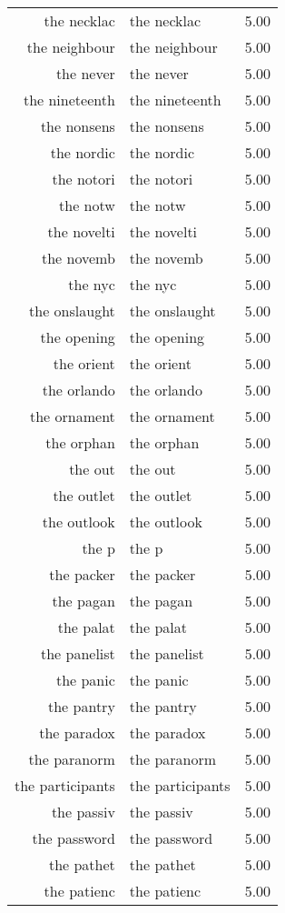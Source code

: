 \begin{table}[ht]
\begin{tabular}{rlr}
  the necklac & the necklac & 5.00 \\ 
  the neighbour & the neighbour & 5.00 \\ 
  the never & the never & 5.00 \\ 
  the nineteenth & the nineteenth & 5.00 \\ 
  the nonsens & the nonsens & 5.00 \\ 
  the nordic & the nordic & 5.00 \\ 
  the notori & the notori & 5.00 \\ 
  the notw & the notw & 5.00 \\ 
  the novelti & the novelti & 5.00 \\ 
  the novemb & the novemb & 5.00 \\ 
  the nyc & the nyc & 5.00 \\ 
  the onslaught & the onslaught & 5.00 \\ 
  the opening & the opening & 5.00 \\ 
  the orient & the orient & 5.00 \\ 
  the orlando & the orlando & 5.00 \\ 
  the ornament & the ornament & 5.00 \\ 
  the orphan & the orphan & 5.00 \\ 
  the out & the out & 5.00 \\ 
  the outlet & the outlet & 5.00 \\ 
  the outlook & the outlook & 5.00 \\ 
  the p & the p & 5.00 \\ 
  the packer & the packer & 5.00 \\ 
  the pagan & the pagan & 5.00 \\ 
  the palat & the palat & 5.00 \\ 
  the panelist & the panelist & 5.00 \\ 
  the panic & the panic & 5.00 \\ 
  the pantry & the pantry & 5.00 \\ 
  the paradox & the paradox & 5.00 \\ 
  the paranorm & the paranorm & 5.00 \\ 
  the participants & the participants & 5.00 \\ 
  the passiv & the passiv & 5.00 \\ 
  the password & the password & 5.00 \\ 
  the pathet & the pathet & 5.00 \\ 
  the patienc & the patienc & 5.00 \\ 

\end{tabular}
\end{table}
